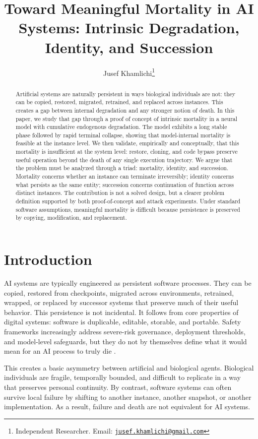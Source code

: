 \documentclass[11pt]{article}
\title{Toward Meaningful Mortality in AI Systems: Intrinsic Degradation, Identity, and Succession}
\author{Jusef Khamlichi\thanks{Independent Researcher. Email: \href{mailto:jusef.khamlichi@gmail.com}{\texttt{jusef.khamlichi@gmail.com}}}}
\date{}
\begin{document}
\maketitle

\begin{abstract}
Artificial systems are naturally persistent in ways biological individuals are not: they can be copied, restored, migrated, retrained, and replaced across instances. This creates a gap between internal degradation and any stronger notion of death. In this paper, we study that gap through a proof of concept of intrinsic mortality in a neural model with cumulative endogenous degradation. The model exhibits a long stable phase followed by rapid terminal collapse, showing that model-internal mortality is feasible at the instance level. We then validate, empirically and conceptually, that this mortality is insufficient at the system level: restore, cloning, and code bypass preserve useful operation beyond the death of any single execution trajectory. We argue that the problem must be analyzed through a triad: mortality, identity, and succession. Mortality concerns whether an instance can terminate irreversibly; identity concerns what persists as the same entity; succession concerns continuation of function across distinct instances. The contribution is not a solved design, but a clearer problem definition supported by both proof-of-concept and attack experiments. Under standard software assumptions, meaningful mortality is difficult because persistence is preserved by copying, modification, and replacement.
\end{abstract}

\newpage
\section{Introduction}

AI systems are typically engineered as persistent software processes. They can be copied, restored from checkpoints, migrated across environments, retrained, wrapped, or replaced by successor systems that preserve much of their useful behavior. This persistence is not incidental. It follows from core properties of digital systems: software is duplicable, editable, storable, and portable. Safety frameworks increasingly address severe-risk governance, deployment thresholds, and model-level safeguards, but they do not by themselves define what it would mean for an AI process to truly die \cite{nist-airmf,openai-preparedness}.

This creates a basic asymmetry between artificial and biological agents. Biological individuals are fragile, temporally bounded, and difficult to replicate in a way that preserves personal continuity. By contrast, software systems can often survive local failure by shifting to another instance, another snapshot, or another implementation. As a result, failure and death are not equivalent for AI systems.
\end{document}
